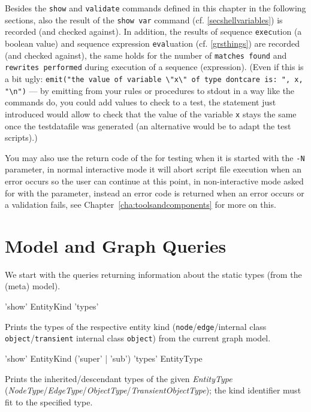 Besides the \texttt{show} and \texttt{validate} commands defined in this chapter in the following sections, also the result of the \texttt{show var} command (cf. \ref{secshellvariables}) is recorded (and checked against).
In addition, the results of sequence \texttt{exec}ution (a boolean value) and sequence expression \texttt{eval}uation (cf. \ref{grsthings}) are recorded (and checked against),
the same holds for the number of \texttt{matches found} and \texttt{rewrites performed} during execution of a sequence (expression).
(Even if this is a bit ugly: 
\verb#emit("the value of variable \"x\" of type dontcare is: ", x, "\n")#
--- by emitting from your rules or procedures to stdout in a way like the commands do, you could add values to check to a test, the statement just introduced would allow to check that the value of the variable \texttt{x} stays the same once the testdatafile was generated (an alternative would be to adapt the test scripts).)

You may also use the return code of the \GrShell{} for testing when it is started with the \texttt{-N} parameter,
in normal interactive mode it will abort script file execution when an error occurs so the user can continue at this point, in non-interactive mode asked for with the parameter, instead an error code is returned when an error occurs or a validation fails, see Chapter~\ref{cha:toolsandcomponents} for more on this.


\section{Model and Graph Queries}

We start with the queries returning information about the static types (from the (meta) model).

\begin{rail}
  'show' EntityKind 'types'
\end{rail}
Prints the types of the respective entity kind (\texttt{node}/\texttt{edge}/internal class \texttt{object}/\texttt{transient} internal class \texttt{object}) from the current graph model.

\begin{rail}
  'show' EntityKind ('super' | 'sub') 'types' EntityType
\end{rail}
Prints the inherited/descendant types of the given \emph{Entity\-Type} (\emph{Node\-Type}/\emph{Edge\-Type}/\emph{Object\-Type}/\emph{Transient\-Object\-Type}); the kind identifier must fit to the specified type.


